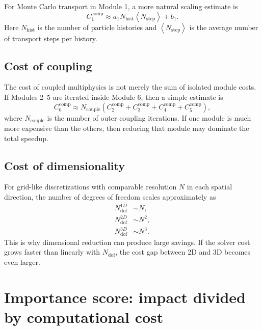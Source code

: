 \documentclass[11pt]{article}
\begin{document}
For Monte Carlo transport in Module 1, a more natural scaling estimate is
\begin{equation}
    \boxed{
    C_1^{\mathrm{comp}}
    \approx
    a_1
    N_{\mathrm{hist}}
    \left\langle N_{\mathrm{step}}\right\rangle
    +b_1.
    }
    \label{eq:mc_cost_model}
\end{equation}
Here \(N_{\mathrm{hist}}\) is the number of particle histories and \(\left\langle N_{\mathrm{step}}\right\rangle\) is the average number of transport steps per history.

\subsection{Cost of coupling}
The cost of coupled multiphysics is not merely the sum of isolated module costs. If Modules 2--5 are iterated inside Module 6, then a simple estimate is
\begin{equation}
    C_6^{\mathrm{comp}}
    \approx
    N_{\mathrm{couple}}
    \left(
    C_2^{\mathrm{comp}}
    +C_3^{\mathrm{comp}}
    +C_4^{\mathrm{comp}}
    +C_5^{\mathrm{comp}}
    \right),
    \label{eq:coupled_cost_model}
\end{equation}
where \(N_{\mathrm{couple}}\) is the number of outer coupling iterations. If one module is much more expensive than the others, then reducing that module may dominate the total speedup.

\subsection{Cost of dimensionality}
For grid-like discretizations with comparable resolution \(N\) in each spatial direction, the number of degrees of freedom scales approximately as
\begin{align}
    N_{\mathrm{dof}}^{1D} &\sim N,\label{eq:dof_1d}\\
    N_{\mathrm{dof}}^{2D} &\sim N^2,\label{eq:dof_2d}\\
    N_{\mathrm{dof}}^{3D} &\sim N^3.\label{eq:dof_3d}
\end{align}
This is why dimensional reduction can produce large savings. If the solver cost grows faster than linearly with \(N_{\mathrm{dof}}\), the cost gap between 2D and 3D becomes even larger.

\section{Importance score: impact divided by computational cost}
\end{document}

